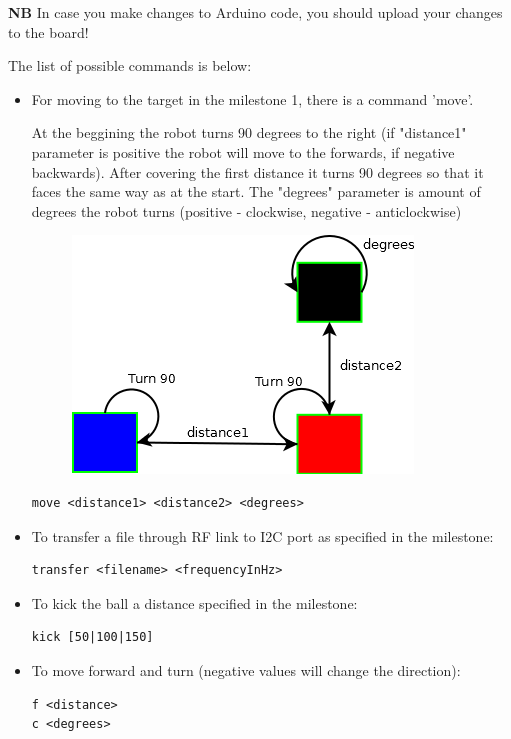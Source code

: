 \documentclass[12pt]{article}
\begin{document}
\textbf{NB} In case you make changes to Arduino code, you should upload your changes to the board!
\bigskip

The list of possible commands is below:
\bigskip
\begin{itemize}
\item For moving to the target in the milestone 1, there is a command 'move'.
\bigskip

At the beggining the robot turns 90 degrees to the right (if "distance1" parameter is positive the robot will move to the forwards, if negative backwards). After covering the first distance it turns 90 degrees so that it faces the same way as at the start. The "degrees" parameter is amount of degrees the robot turns (positive - clockwise, negative - anticlockwise)
\bigskip

\begin{figure}
    \centering
    \includegraphics{Diagram1}
\end{figure}

\begin{lstlisting}
move <distance1> <distance2> <degrees>
\end{lstlisting}
\newpage

\item To transfer a file through RF link to I2C port as specified in the milestone:
\begin{lstlisting}
transfer <filename> <frequencyInHz>
\end{lstlisting}

\item To kick the ball a distance specified in the milestone:
\begin{lstlisting}
kick [50|100|150]
\end{lstlisting}

\item To move forward and turn (negative values will change the direction):
\begin{lstlisting}
f <distance>
c <degrees>
\end{lstlisting}


\end{itemize}
\end{document}
